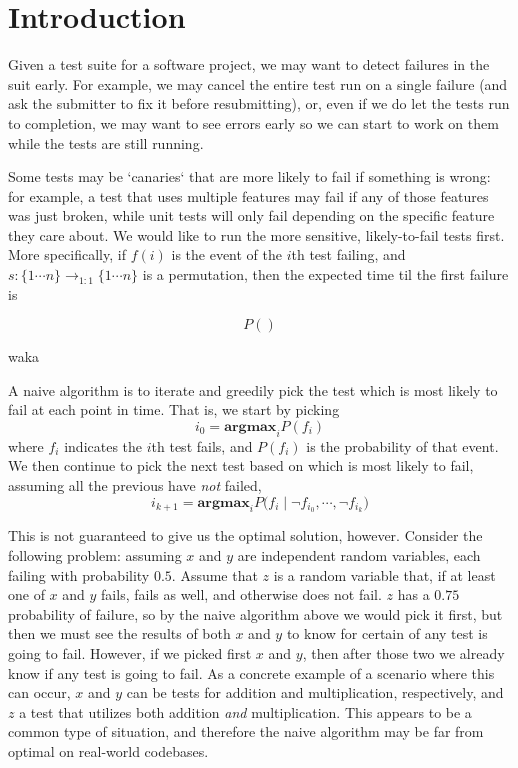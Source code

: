 \documentclass[12pt]{article}
\begin{document}
\maketitle


\section{Introduction}
Given a test suite for a software project, we may want to detect failures in the suit early. For example, we may cancel the entire test run on a single failure (and ask the submitter to fix it before resubmitting), or, even if we do let the tests run to completion, we may want to see errors early so we can start to work on them while the tests are still running.

Some tests may be `canaries` that are more likely to fail if something is wrong: for example, a test that uses multiple features may fail if any of those features was just broken, while unit tests will only fail depending on the specific feature they care about. We would like to run the more sensitive, likely-to-fail tests first. More specifically, if $f(i)$ is the event of the $i$th test failing, and $s : \{ 1\cdots n \} \rightarrow_{1:1} \{ 1 \cdots n \}$ is a permutation, then the expected time til the first failure is

\[ P() \]

waka


A naive algorithm is to iterate and greedily pick the test which is most likely to fail at each point in time. That is, we start by picking
\[ i_0 = \textbf{argmax}_{i} P(f_i) \]
where $f_i$ indicates the $i$th test fails, and $P(f_i)$ is the probability of that event. We then continue to pick the next test based on which is most likely to fail, assuming all the previous have \emph{not} failed,
\[ i_{k+1} = \textbf{argmax}_{i} P\Big(f_i \; \Big| \; \neg f_{i_0}, \cdots , \neg f_{i_k} \Big) \]

This is not guaranteed to give us the optimal solution, however. Consider the following problem: assuming $x$ and $y$ are independent random variables, each failing with probability $0.5$. Assume that $z$ is a random variable that, if at least one of $x$ and $y$ fails, fails as well, and otherwise does not fail. $z$ has a $0.75$ probability of failure, so by the naive algorithm above we would pick it first, but then we must see the results of both $x$ and $y$ to know for certain of any test is going to fail. However, if we picked first $x$ and $y$, then after those two we already know if any test is going to fail. As a concrete example of a scenario where this can occur, $x$ and $y$ can be tests for addition and multiplication, respectively, and $z$ a test that utilizes both addition \emph{and} multiplication. This appears to be a common type of situation, and therefore the naive algorithm may be far from optimal on real-world codebases.
\end{document}
